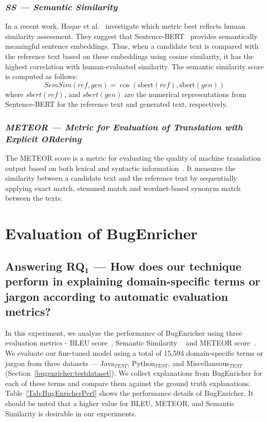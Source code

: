 \subsubsection{\emph{\textit{SS --- Semantic Similarity}}}
In a recent work, Haque et al.~\cite{haque2022semantic} investigate which metric best reflects human similarity assessment. They suggest that Sentence-BERT~\cite{reimers2019sentence} provides semantically meaningful sentence embeddings. Thus, when a candidate text is compared with the reference text based on these embeddings using cosine similarity, it has the highest correlation with human-evaluated similarity. The semantic similarity score is computed as follows:
\begin{equation}
SemSim(ref, gen) = \cos(\text{sbert}(ref), \text{sbert}(gen))  
\end{equation}
where $sbert(ref)$, and $sbert(gen)$ are the numerical representations from Sentence-BERT for the reference text and generated text, respectively.

\subsubsection{\emph{\textit{METEOR --- Metric for Evaluation of Translation with Explicit ORdering }}}
The \acrshort{METEOR} score is a metric for evaluating the quality of machine translation output based on both lexical and syntactic information~\cite{banerjee2005meteor}. It measures the similarity between a candidate text and the reference text by sequentially applying exact match, stemmed match and wordnet-based synonym match between the texts. 


\section{Evaluation of BugEnricher} \label{Chap2:Results}

\subsection{Answering RQ$\mathbf{_1}$ --- How does our technique perform in explaining domain-specific terms or jargon according to automatic evaluation metrics?} \label{Chap2:RQ1}

In this experiment, we analyze the performance of BugEnricher using three evaluation metrics - \acrshort{BLEU} score~\cite{papineni2002bleu}, \acrlong{Semantic Similarity} ~\cite{haque2022semantic} and \acrshort{METEOR} score~\cite{banerjee2005meteor}. We evaluate our fine-tuned model using a total of 15,594 domain-specific terms or jargon from three datasets --- Java$_{TEST}$, Python$_{TEST}$, and Miscellaneous$_{TEST}$ (Section~\ref{bugenricher:testdataset}). We collect explanations from BugEnricher for each of these terms and compare them against the ground truth explanations. Table~\ref{Tab:BugEnricherPerf} shows the performance details of BugEnricher. It should be noted that a higher value for \acrshort{BLEU}, \acrshort{METEOR}, and \acrlong{Semantic Similarity} is desirable in our experiments. \par

